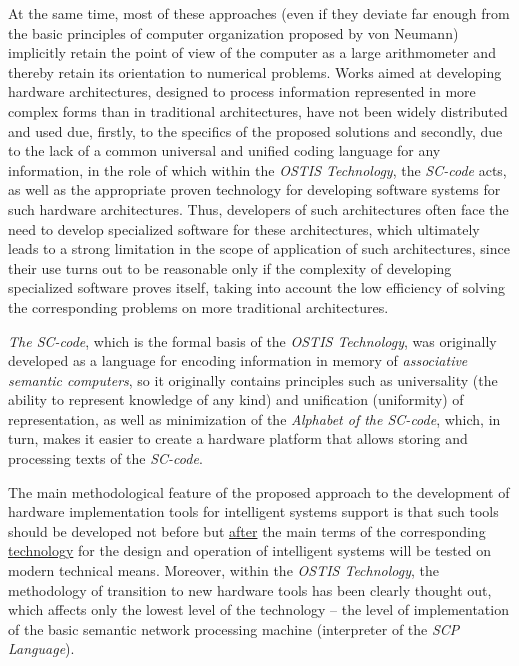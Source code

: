 \documentclass{article}
\begin{document}
\begin{multicols}{2}
\par At the same time, most of these approaches (even if they deviate far enough from the basic principles of computer organization proposed by von Neumann) implicitly retain the point of view of the computer as a large arithmometer and thereby retain its orientation to numerical problems. Works aimed at developing hardware architectures, designed to process information represented in more complex forms than in traditional architectures, have not been widely distributed and used due, firstly, to the specifics of the proposed solutions and secondly, due to the lack of a common universal and unified coding language for any information, in the role of which within the \textit{OSTIS Technology}, the \textit{SC-code} acts, as well as the appropriate proven technology for developing software systems for such hardware architectures. Thus, developers of such architectures often face the need to develop specialized software for these architectures, which ultimately leads to a strong limitation in the scope of application of such architectures, since their use turns out
to be reasonable only if the complexity of developing specialized software proves itself, taking into account the low efficiency of solving the corresponding problems on more traditional architectures.
\par \textit{The SC-code}, which is the formal basis of the \textit{OSTIS Technology}, was originally developed as a language for encoding information in memory of \textit{associative semantic computers}, so it originally contains principles such as universality (the ability to represent knowledge of any kind) and unification (uniformity) of representation, as well as minimization of the \textit{Alphabet of the SC-code}, which, in turn, makes it easier to create a hardware platform that allows storing and processing texts of the \textit{SC-code}.
\par The main methodological feature of the proposed approach to the development of hardware implementation tools for intelligent systems support is that such tools should be developed not before but \underline{after} the main terms of the corresponding \underline{technology} for the design and operation of intelligent systems will be tested on modern technical means. Moreover, within the \textit{OSTIS Technology}, the methodology of transition to new hardware tools has been clearly thought out, which affects only the lowest level of the technology – the level of implementation of the basic semantic network processing machine (interpreter of the \textit{SCP Language}).

\end{multicols}
\end{document}
